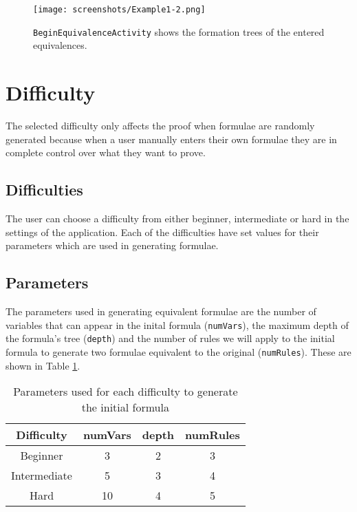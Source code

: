 \documentclass[draft]{report}
\begin{document}
\begin{figure}[ht!]
    \centering
    \texttt{[image: screenshots/Example1-2.png]}
    \caption{{\tt BeginEquivalenceActivity} shows the formation trees of the entered equivalences.}
    \label{beginequivalenceactivity}
\end{figure}
 
\section{Difficulty}
\label{sec:difficulty}

The selected difficulty only affects the proof when formulae are randomly generated because when a user manually enters their own formulae they are in complete control over what they want to prove.

\subsection{Difficulties}

The user can choose a difficulty from either beginner, intermediate or hard in the settings of the application. Each of the difficulties have set values for their parameters which are used in generating formulae. 

\subsection{Parameters}

The parameters used in generating equivalent formulae are the number of variables that can appear in the inital formula ({\tt numVars}), the maximum depth of the formula's tree ({\tt depth}) and the number of rules we will apply to the initial formula to generate two formulae equivalent to the original ({\tt numRules}). These are shown in Table \ref{table:parameters}.

\begin{table}[ht!]
\begin{center}
  \begin{tabular}{ | c | c | c | c | }
    \hline
    Difficulty & numVars & depth & numRules \\ \hline
    Beginner & 3 & 2 & 3 \\
    Intermediate & 5 & 3 & 4 \\
    Hard & 10 & 4 & 5 \\
    \hline
  \end{tabular}
\end{center}
\caption{Parameters used for each difficulty to generate the initial formula}
\label{table:parameters}
\end{table}
\end{document}
